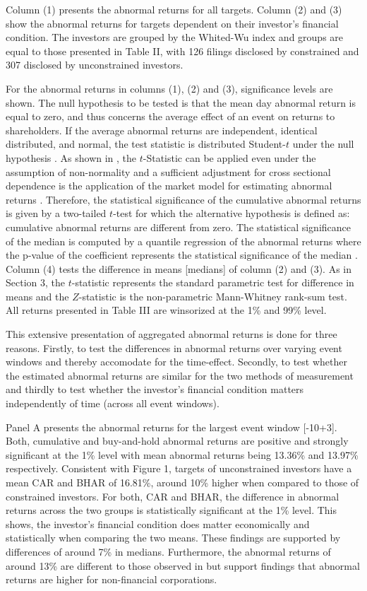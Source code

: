 \documentclass[12pt]{article}
\begin{document}
Column (1) presents the abnormal returns for all targets. Column (2) and (3) show the abnormal returns for targets dependent on their investor's financial condition. The investors are grouped by the Whited-Wu index and groups are equal to those presented in Table II, with 126 filings disclosed by constrained and 307 disclosed by unconstrained investors.\par
For the abnormal returns in columns (1), (2) and (3), significance levels are shown. The null hypothesis to be tested is that the mean day abnormal return is equal to zero, and thus concerns the average effect of an event on returns to shareholders. If the average abnormal returns are independent, identical distributed, and normal, the test statistic is distributed Student-$t$ under the null hypothesis \citep[p.7]{Brown1985}. As shown in \citet[p.11]{Brown1985}, the $t$-Statistic can be applied even under the assumption of non-normality and a sufficient adjustment for cross sectional dependence is the application of the market model for estimating abnormal returns \citep[p.22]{Brown1985}. Therefore, the statistical significance of the cumulative abnormal returns is given by a two-tailed $t$-test for which the alternative hypothesis is defined as: cumulative abnormal returns are different from zero. The statistical significance of the median is computed by a quantile regression of the abnormal returns where the p-value of the coefficient represents the statistical significance of the median \citep{Ucla}. Column (4) tests the difference in means [medians] of column (2) and (3). As in Section 3, the $t$-statistic represents the standard parametric test for difference in means and the $Z$-statistic is the non-parametric Mann-Whitney rank-sum test. All returns  presented in Table III are winsorized at the 1\% and 99\% level.\par
This extensive presentation of aggregated abnormal returns is done for three reasons. Firstly, to test the differences in abnormal returns over varying event windows and thereby accomodate for the time-effect. Secondly, to test whether the estimated abnormal returns are similar for the two methods of measurement and thirdly to test whether the investor's financial condition matters independently of time (across all event windows).\par
Panel A presents the abnormal returns for the largest event window [-10+3]. Both, cumulative and buy-and-hold abnormal returns are positive and strongly significant at the 1\% level with mean abnormal returns being 13.36\% and 13.97\% respectively. Consistent with Figure 1, targets of unconstrained investors have a mean CAR and BHAR of 16.81\%, around 10\% higher when compared to those of constrained investors. For both, CAR and BHAR, the difference in abnormal returns across the two groups is statistically significant at the 1\% level. This shows, the investor's financial condition does matter economically and statistically when comparing the two means. These findings are supported by differences of around 7\% in medians. Furthermore, the abnormal returns of around 13\% are different to those observed in \citet[p.208]{Klein2009} but support \citet[p.29]{Brigida2012} findings that abnormal returns are higher for non-financial corporations.\par
\end{document}
